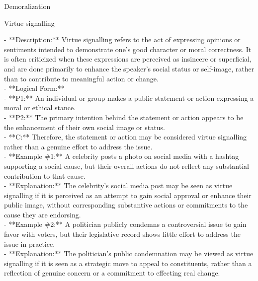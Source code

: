 \documentclass[a4paper,12pt,single,pdftex]{scrbook}
\begin{document}
Demoralization

Virtue signalling
    
      - **Description:** Virtue signalling refers to the act of expressing opinions or sentiments intended to demonstrate one's good character or moral correctness. It is often criticized when these expressions are perceived as insincere or superficial, and are done primarily to enhance the speaker's social status or self-image, rather than to contribute to meaningful action or change.
    \\

    
      - **Logical Form:**
    \\

    
        - **P1:** An individual or group makes a public statement or action expressing a moral or ethical stance.
    \\

    
        - **P2:** The primary intention behind the statement or action appears to be the enhancement of their own social image or status.
    \\

    
        - **C:** Therefore, the statement or action may be considered virtue signalling rather than a genuine effort to address the issue.
    \\

    
      - **Example \#1:** A celebrity posts a photo on social media with a hashtag supporting a social cause, but their overall actions do not reflect any substantial contribution to that cause.
    \\

    
      - **Explanation:** The celebrity's social media post may be seen as virtue signalling if it is perceived as an attempt to gain social approval or enhance their public image, without corresponding substantive actions or commitments to the cause they are endorsing.
    \\

    
      - **Example \#2:** A politician publicly condemns a controversial issue to gain favor with voters, but their legislative record shows little effort to address the issue in practice.
    \\

    
      - **Explanation:** The politician’s public condemnation may be viewed as virtue signalling if it is seen as a strategic move to appeal to constituents, rather than a reflection of genuine concern or a commitment to effecting real change.
    \\
\end{document}
